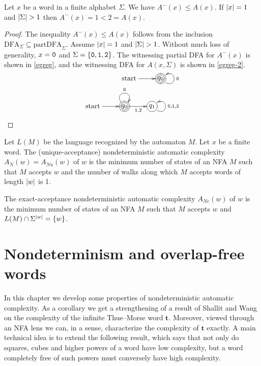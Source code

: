 		\begin{theorem}\label{dec13-2022-II}
			Let $x$ be a word in a finite alphabet $\Sigma$. We have $A^-(x)\le A(x)$.
			If $\lvert x\rvert=1$ and $\lvert\Sigma\rvert>1$ then $A^-(x)=1<2=A(x)$.
		\end{theorem}
		\begin{proof}
			The inequality $A^-(x)\le A(x)$ follows from the inclusion $\mathrm{DFA}_\Sigma\subseteq\mathrm{partDFA}_\Sigma$.
			Assume $\lvert x\rvert=1$ and $\lvert\Sigma\rvert>1$. Without much loss of generality, $x=\mathtt 0$ and $\Sigma=\{\mathtt 0, \mathtt 1, \mathtt 2\}$.
			The witnessing partial DFA for $A^-(x)$ is shown in \eqref{egreg},
			and the witnessing DFA for $A(x,\Sigma)$ is shown in \eqref{egreg-2}.
			\begin{eqnarray}
				\begin{gathered}\label{egreg}
				\xymatrix{
					\text{start}\ar[r] & *+[Foo]{q_0}\ar@(dr,ur)_{\mt{0}}
				}
				\end{gathered}\\
				\begin{gathered}\label{egreg-2}
				\xymatrix{
					\text{start}\ar[r] & *+[Foo]{q_0}\ar@(ul,ur)^{\mt 0}\ar[r]_{\mt{1}, \mt{2}} & *+[Fo]{q_1}\ar@(dr,ur)_{\mt{0},\mt{1},\mt{2}}
				}
				\end{gathered}
			\end{eqnarray}
		\end{proof}
		\begin{definition}[{\cite{MR3386523,MR1897300}}]\label{precise}
			Let $L(M)$ be the language recognized by the automaton $M$.
			Let $x$ be a finite word.
			The (unique-acceptance) nondeterministic automatic complexity
			$A_N(w)=A_{Nu}(w)$ of $w$ is
			the minimum number of states of an NFA $M$
			such that $M$ accepts $w$ and the number of walks
			along which $M$ accepts words of length $\lvert w\rvert$ is 1.

			The exact-acceptance nondeterministic automatic complexity
			$A_{Ne}(w)$ of $w$ is
			the minimum number of states of an NFA $M$
			such that $M$ accepts $w$ and $L(M)\cap\Sigma^{\lvert w\rvert}=\{w\}$.
		\end{definition}


\chapter{Nondeterminism and overlap-free words}\label{chap:EJC}

	
	In this chapter we develop some properties of nondeterministic automatic complexity.
	As a corollary we get a strengthening of a result of Shallit and Wang~\cite{MR1897300}
	on the complexity of the infinite Thue--Morse word $\mathbf t$.
	Moreover, viewed through an NFA lens we can, in a sense, characterize the complexity of $\mathbf t$ exactly.
	A main technical idea is to extend the following result, which says that not only do squares, cubes and higher powers of a word have low complexity,
	but a word completely free of such powers must conversely have high complexity.


